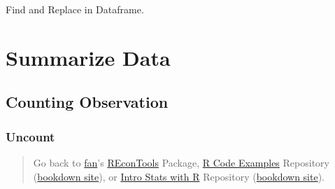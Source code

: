 \documentclass[
]{book}
\newenvironment{Shaded}{\begin{snugshade}}{\end{snugshade}}
\newcommand{\CommentTok}[1]{\textcolor[rgb]{0.56,0.35,0.01}{\textit{#1}}}
\newcommand{\FunctionTok}[1]{\textcolor[rgb]{0.00,0.00,0.00}{#1}}
\newcommand{\NormalTok}[1]{#1}
\newcommand{\SpecialCharTok}[1]{\textcolor[rgb]{0.00,0.00,0.00}{#1}}
\newcommand{\StringTok}[1]{\textcolor[rgb]{0.31,0.60,0.02}{#1}}
\begin{document}
Find and Replace in Dataframe.

\begin{Shaded}
\end{Shaded}

\hypertarget{summarize-data}{%
\chapter{Summarize Data}\label{summarize-data}}

\hypertarget{counting-observation}{%
\section{Counting Observation}\label{counting-observation}}

\hypertarget{uncount}{%
\subsection{Uncount}\label{uncount}}

\begin{quote}
Go back to \href{http://fanwangecon.github.io/}{fan}'s \href{https://fanwangecon.github.io/REconTools/}{REconTools} Package, \href{https://fanwangecon.github.io/R4Econ/}{R Code Examples} Repository (\href{https://fanwangecon.github.io/R4Econ/bookdown}{bookdown site}), or \href{https://fanwangecon.github.io/Stat4Econ/}{Intro Stats with R} Repository (\href{https://fanwangecon.github.io/Stat4Econ/bookdown}{bookdown site}).
\end{quote}
\end{document}
